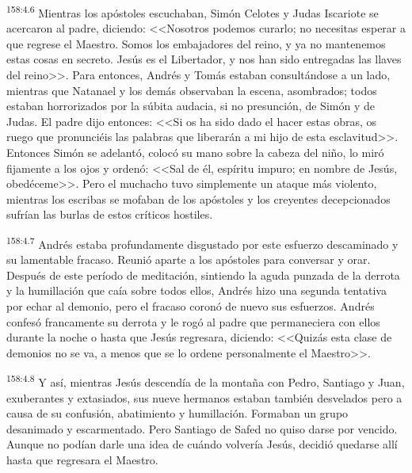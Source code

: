 \par 
\textsuperscript{158:4.6} Mientras los apóstoles escuchaban, Simón Celotes y Judas Iscariote se acercaron al padre, diciendo: <<Nosotros podemos curarlo; no necesitas esperar a que regrese el Maestro. Somos los embajadores del reino, y ya no mantenemos estas cosas en secreto. Jesús es el Libertador, y nos han sido entregadas las llaves del reino>>. Para entonces, Andrés y Tomás estaban consultándose a un lado, mientras que Natanael y los demás observaban la escena, asombrados; todos estaban horrorizados por la súbita audacia, si no presunción, de Simón y de Judas. El padre dijo entonces: <<Si os ha sido dado el hacer estas obras, os ruego que pronunciéis las palabras que liberarán a mi hijo de esta esclavitud>>. Entonces Simón se adelantó, colocó su mano sobre la cabeza del niño, lo miró fijamente a los ojos y ordenó: <<Sal de él, espíritu impuro; en nombre de Jesús, obedéceme>>. Pero el muchacho tuvo simplemente un ataque más violento, mientras los escribas se mofaban de los apóstoles y los creyentes decepcionados sufrían las burlas de estos críticos hostiles.

\par 
\textsuperscript{158:4.7} Andrés estaba profundamente disgustado por este esfuerzo descaminado y su lamentable fracaso. Reunió aparte a los apóstoles para conversar y orar. Después de este período de meditación, sintiendo la aguda punzada de la derrota y la humillación que caía sobre todos ellos, Andrés hizo una segunda tentativa por echar al demonio, pero el fracaso coronó de nuevo sus esfuerzos. Andrés confesó francamente su derrota y le rogó al padre que permaneciera con ellos durante la noche o hasta que Jesús regresara, diciendo: <<Quizás esta clase de demonios no se va, a menos que se lo ordene personalmente el Maestro>>.

\par 
\textsuperscript{158:4.8} Y así, mientras Jesús descendía de la montaña con Pedro, Santiago y Juan, exuberantes y extasiados, sus nueve hermanos estaban también desvelados pero a causa de su confusión, abatimiento y humillación. Formaban un grupo desanimado y escarmentado. Pero Santiago de Safed no quiso darse por vencido. Aunque no podían darle una idea de cuándo volvería Jesús, decidió quedarse allí hasta que regresara el Maestro.

